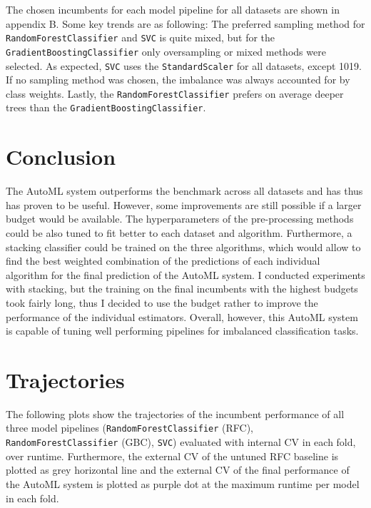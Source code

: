 \documentclass[11pt]{article}
\begin{document}
The chosen incumbents for each model pipeline for all datasets are shown in appendix B. Some key trends are as following: The preferred sampling method for \texttt{RandomForestClassifier} and \texttt{SVC} is quite mixed, but for the \texttt{GradientBoostingClassifier} only oversampling or mixed methods were selected. As expected, \texttt{SVC} uses the \texttt{StandardScaler} for all datasets, except 1019. If no sampling method was chosen, the imbalance was always accounted for by class weights. Lastly, the \texttt{RandomForestClassifier} prefers on average deeper trees than the \texttt{GradientBoostingClassifier}. \\

\section{Conclusion}

The AutoML system outperforms the benchmark across all datasets and has thus has proven to be useful. However, some improvements are still possible if a larger budget would be available. The hyperparameters of the pre-processing methods could be also tuned to fit better to each dataset and algorithm. Furthermore, a stacking classifier could be trained on the three algorithms, which would allow to find the best weighted combination of the predictions of each individual algorithm for the final prediction of the AutoML system. I conducted experiments with stacking, but the training on the final incumbents with the highest budgets took fairly long, thus I decided to use the budget rather to improve the performance of the individual estimators. Overall, however, this AutoML system is capable of tuning well performing pipelines for imbalanced classification tasks.





\newpage
\appendix

\section{Trajectories}

The following plots show the trajectories of the incumbent performance of all three model pipelines (\texttt{RandomForestClassifier} (RFC), \texttt{RandomForestClassifier} (GBC), \texttt{SVC}) evaluated with internal CV in each fold, over runtime. Furthermore, the external CV of the untuned RFC baseline is plotted as grey horizontal line and the external CV of the final performance of the AutoML system is plotted as purple dot at the maximum runtime per model in each fold.
\end{document}
